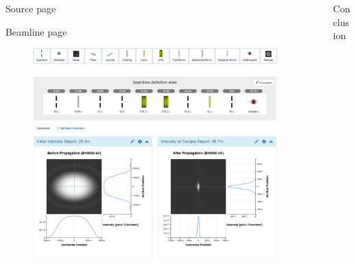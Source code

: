 \documentclass[final]{beamer}
\newlength{\sepwid}
\newlength{\onecolwid}
\newlength{\twocolwid}
\begin{document}
\begin{frame}[t]
\begin{columns}[t]
\begin{column}{\twocolwid}
\begin{block}{\faLightbulbO{} Source page}
\end{block} 


\begin{block}{\faSignIn{} \faEllipsisH{} \faSignOut{} \faBullseye{} Beamline page}

\begin{figure}
\includegraphics[width=0.85\linewidth]{images/toolbar_menu.png}
\end{figure}

\begin{figure}
\includegraphics[width=0.85\linewidth]{images/beamline_page.png}
\end{figure}

\end{block}



\end{column} %

\begin{column}{\sepwid}\end{column} %

\begin{column}{\onecolwid} %


\begin{block}{\faFlag{} Conclusion}


\end{block}
\end{column}
\end{columns}
\end{frame}
\end{document}

